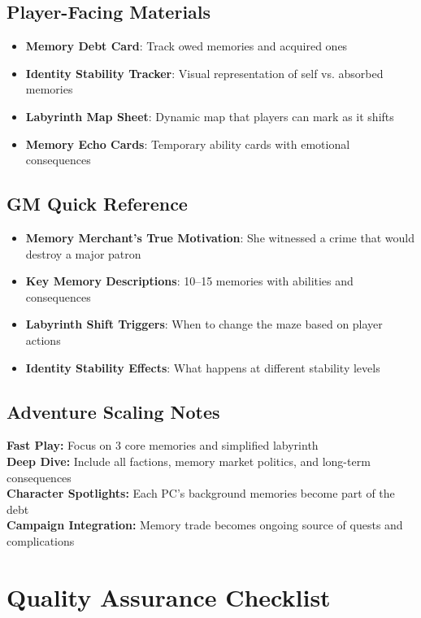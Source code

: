 \documentclass[11pt]{article}
\begin{document}
\subsection*{Player-Facing Materials}
\begin{itemize}[leftmargin=*]
  \item \textbf{Memory Debt Card}: Track owed memories and acquired ones
  \item \textbf{Identity Stability Tracker}: Visual representation of self vs. absorbed memories
  \item \textbf{Labyrinth Map Sheet}: Dynamic map that players can mark as it shifts
  \item \textbf{Memory Echo Cards}: Temporary ability cards with emotional consequences
\end{itemize}

\subsection*{GM Quick Reference}
\begin{itemize}[leftmargin=*]
  \item \textbf{Memory Merchant's True Motivation}: She witnessed a crime that would destroy a major patron
  \item \textbf{Key Memory Descriptions}: 10--15 memories with abilities and consequences
  \item \textbf{Labyrinth Shift Triggers}: When to change the maze based on player actions
  \item \textbf{Identity Stability Effects}: What happens at different stability levels
\end{itemize}

\subsection*{Adventure Scaling Notes}
\textbf{Fast Play:} Focus on 3 core memories and simplified labyrinth \\
\textbf{Deep Dive:} Include all factions, memory market politics, and long-term consequences \\
\textbf{Character Spotlights:} Each PC's background memories become part of the debt \\
\textbf{Campaign Integration:} Memory trade becomes ongoing source of quests and complications

\section*{Quality Assurance Checklist}
\end{document}
